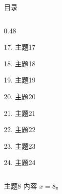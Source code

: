 \documentclass[aspectratio=169,10pt,fontset=fandol]{ctexbeamer}
\begin{document}
\begin{frame}[t,fragile]{目录}
\begin{columns}[T,onlytextwidth]
\begin{column}{0.48\textwidth}
{\color{gray!40}\small 17. 主题17\par}\vspace{0.22em}
{\color{gray!40}\small 18. 主题18\par}\vspace{0.22em}
{\color{gray!40}\small 19. 主题19\par}\vspace{0.22em}
{\color{gray!40}\small 20. 主题20\par}\vspace{0.22em}
{\color{gray!40}\small 21. 主题21\par}\vspace{0.22em}
{\color{gray!40}\small 22. 主题22\par}\vspace{0.22em}
{\color{gray!40}\small 23. 主题23\par}\vspace{0.22em}
{\color{gray!40}\small 24. 主题24\par}\vspace{0.22em}
\end{column}
\end{columns}
\end{frame}
\begin{frame}[t,fragile]{主题8}
\normalsize
{\normalsize
内容 $x=8$。
}
\end{frame}
\end{document}
